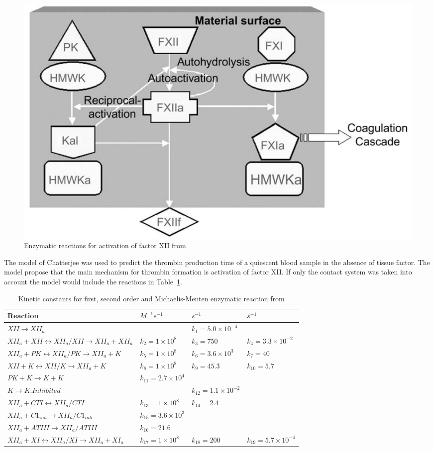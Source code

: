 \documentclass[%
 nofootinbib,
 amsmath,amssymb,
 aps,
 pra,
]{revtex4-1}
\begin{document}
\begin{figure}[h]
\includegraphics[scale=0.4]{Figures/ActivationFXIIa.png}
\caption{\label{fig:activationFXIIa} Enzymatic reactions for activation of  factor XII from \citet{Chatterjee:2009a}}
\end{figure}
The model of Chatterjee was used to predict the thrombin production time of a quiescent blood sample in the absence of tissue factor. The model propose that the main mechanism for thrombin formation is activation of factor XII. If only the contact system was taken into account the model would include the reactions in Table~\ref{Tab:Sourceterms}.
\begin{table}[h]
\begin{tabular}{p{7 cm} p{3 cm} p{3 cm} p{3 cm}}
\hline
Reaction & $M^{-1}s^{-1}$ & $s^{-1}$ & $s^{-1}$ \\
\hline
$XII \rightarrow XII_{a}$ &   & $k_{1} = 5.0 \times 10^{-4} $ & \\
$XII_{a} + XII \leftrightarrow XII_{a} / XII \rightarrow XII_{a} + XII_{a}$ & $k_{2} = 1 \times 10^{8}$  & $k_{3} = 750$ & $k_{4} = 3.3 \times 10^{-2}$  \\
$XII_{a} + PK \leftrightarrow XII_{a}/PK \rightarrow XII_{a} + K $ & $k_{5} = 1 \times 10^{8}$  & $k_{6} = 3.6 \times 10^{3} $  & $k_{7} = 40$ \\
$XII + K \leftrightarrow XII/K \rightarrow XII_{a} + K$ & $k_{8} = 1 \times 10^{8}$ & $k_{9} = 45.3$ & $k_{10} = 5.7$ \\
$PK + K \rightarrow K + K$ &$k_{11} = 2.7 \times 10^{4}$ &   &  \\
$K \rightarrow K.Inhibited $ & $ $ & $k_{12}=1.1 \times 10^{-2}$  & \\
$XII_{a} + CTI \leftrightarrow XII_{a}/CTI $ & $k_{13} = 1 \times 10^{8}$& $k_{14}=2.4$   & \\
$XII_{a} + C1_{inh}\rightarrow XII_{a}/C1_{inh} $ & $k_{15} = 3.6 \times 10^{3}$   & \\
$XII_{a} + ATIII \rightarrow XII_{a}/ATIII $ & $k_{16} = 21.6$  & \\
$XII_{a} + XI \leftrightarrow XII_{a}/XI \rightarrow XII_{a} + XI_{a}$ & $k_{17} = 1 \times 10^{8}$ & $k_{18} = 200$ &  $k_{19} = 5.7 \times 10^{-4} $ \\
\hline
\end{tabular}
\caption{\label{Tab:Sourceterms} Kinetic constants for first, second order and Michaelis-Menten enzymatic reaction from \citet{Chatterjee:2010}}
\end{table}
\end{document}
